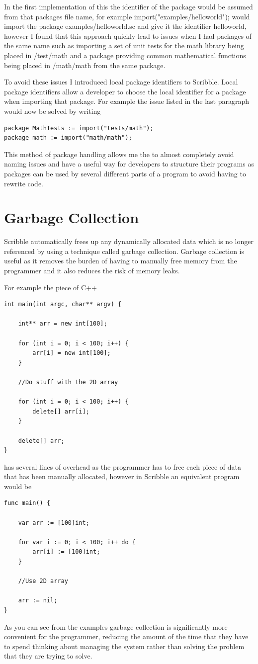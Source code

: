 \documentclass[]{final_report}
\begin{document}
In the first implementation of this the identifier of the package would be assumed from that packages file name, for example import("examples/helloworld"); would import the package examples/helloworld.sc and give it the identifier helloworld, however I found that this approach quickly lead to issues when I had packages of the same name such as importing a set of unit tests for the math library being placed in /test/math and a package providing common mathematical functions being placed in /math/math from the same package. 

To avoid these issues I introduced local package identifiers to Scribble. Local package identifiers allow a developer to choose the local identifier for a package when importing that package. For example the issue listed in the last paragraph would now be solved by writing
\begin{verbatim}
package MathTests := import("tests/math");
package math := import("math/math");
\end{verbatim}

This method of package handling allows me the to almost completely avoid naming issues and have a useful way for developers to structure their programs as packages can be used by several different parts of a program to avoid having to rewrite code.

\chapter{Garbage Collection}

Scribble automatically frees up any dynamically allocated data which is no longer referenced by using a technique called garbage collection. Garbage collection is useful as it removes the burden of having to manually free memory from the programmer and it also reduces the risk of memory leaks. 

For example the piece of C++
\begin{verbatim}
int main(int argc, char** argv) {

	int** arr = new int[100];
	
	for (int i = 0; i < 100; i++) {
		arr[i] = new int[100];		
	}
	
	//Do stuff with the 2D array
	
	for (int i = 0; i < 100; i++) {
		delete[] arr[i];
	}
	
	delete[] arr;
}
\end{verbatim}
has several lines of overhead as the programmer has to free each piece of data that has been manually allocated, however in Scribble an equivalent program would be
\begin{verbatim}
func main() {

	var arr := [100]int;
	
	for var i := 0; i < 100; i++ do {
		arr[i] := [100]int;
	}
	
	//Use 2D array
	
	arr := nil;
}
\end{verbatim}
As you can see from the examples garbage collection is significantly more convenient for the programmer, reducing the amount of the time that they have to spend thinking about managing the system rather than solving the problem that they are trying to solve.
\end{document}
